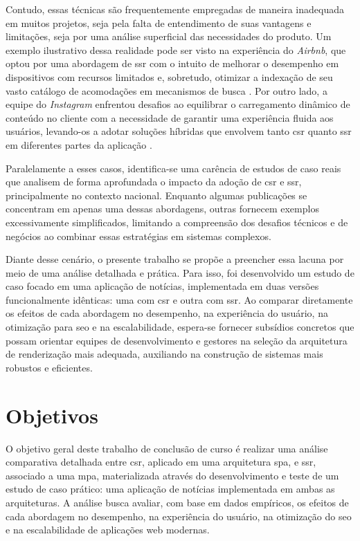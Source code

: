 Contudo, essas técnicas são frequentemente empregadas de maneira inadequada em muitos projetos, seja pela falta de entendimento de suas vantagens e limitações, seja por uma análise superficial das necessidades do produto. Um exemplo ilustrativo dessa realidade pode ser visto na experiência do \emph{Airbnb}, que optou por uma abordagem de \acrshort{ssr} com o intuito de melhorar o desempenho em dispositivos com recursos limitados e, sobretudo, otimizar a indexação de seu vasto catálogo de acomodações em mecanismos de busca \cite{neary2017}. Por outro lado, a equipe do \emph{Instagram} enfrentou desafios ao equilibrar o carregamento dinâmico de conteúdo no cliente com a necessidade de garantir uma experiência fluida aos usuários, levando-os a adotar soluções híbridas que envolvem tanto \acrshort{csr} quanto \acrshort{ssr} em diferentes partes da aplicação \cite{conner2019}.

Paralelamente a esses casos, identifica-se uma carência de estudos de caso reais que analisem de forma aprofundada o impacto da adoção de \acrshort{csr} e \acrshort{ssr}, principalmente no contexto nacional. Enquanto algumas publicações se concentram em apenas uma dessas abordagens, outras fornecem exemplos excessivamente simplificados, limitando a compreensão dos desafios técnicos e de negócios ao combinar essas estratégias em sistemas complexos.

Diante desse cenário, o presente trabalho se propõe a preencher essa lacuna por meio de uma análise detalhada e prática. Para isso, foi desenvolvido um estudo de caso focado em uma aplicação de notícias, implementada em duas versões funcionalmente idênticas: uma com \acrshort{csr} e outra com \acrshort{ssr}. Ao comparar diretamente os efeitos de cada abordagem no desempenho, na experiência do usuário, na otimização para \acrshort{seo} e na escalabilidade, espera-se fornecer subsídios concretos que possam orientar equipes de desenvolvimento e gestores na seleção da arquitetura de renderização mais adequada, auxiliando na construção de sistemas mais robustos e eficientes.

\section{Objetivos}
O objetivo geral deste trabalho de conclusão de curso é realizar uma análise comparativa detalhada entre \acrfull{csr}, aplicado em uma arquitetura \acrfull{spa}, e \acrfull{ssr}, associado a uma \acrfull{mpa}, materializada através do desenvolvimento e teste de um estudo de caso prático: uma aplicação de notícias implementada em ambas as arquiteturas. A análise busca avaliar, com base em dados empíricos, os efeitos de cada abordagem no desempenho, na experiência do usuário, na otimização do \acrfull{seo} e na escalabilidade de aplicações web modernas.

